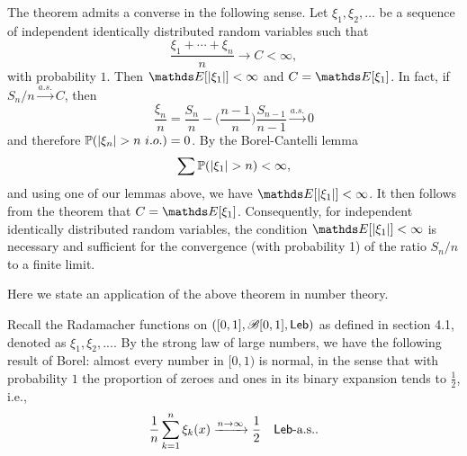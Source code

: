\begin{remark}
The theorem admits a converse in the following sense. Let $\xi_1, \xi_2, \dots$ be a sequence of independent identically distributed random variables such that
\begin{equation*}
    \frac{\xi_1 + \cdots + \xi_n}{n} \to C < \infty,
\end{equation*}
with probability $1$. Then $\E[|\xi_1|] < \infty$ and $C = \E[\xi_1]$. In fact, if $S_n/n \xrightarrow{a.s.}  C$, then
\begin{equation*}
    \frac{\xi_n}{n} = \frac{S_n}{n} - \bigg( \frac{n-1}{n}\bigg) \frac{S_{n-1}}{n-1} \xrightarrow{a.s.} 0
\end{equation*}
and therefore $\mathbb{P}(|\xi_n| > n \, \, i.o.) = 0$. By the Borel-Cantelli lemma
\begin{equation*}
    \sum \mathbb{P}(|\xi_1| > n) < \infty,
\end{equation*}
and using one of our lemmas above, we have $\E[|\xi_1|] < \infty$. It then follows from the theorem that $C = \E[\xi_1]$. Consequently, for independent identically distributed random variables, the condition $\E[|\xi_1|] < \infty$ is necessary and sufficient for the convergence (with probability 1) of the ratio $S_n/n$ to a finite limit.
\end{remark}


Here we state an application of the above theorem in number theory.
\begin{example}
Recall the Radamacher functions on $([0,1], \mathcal{B}[0,1], \mathsf{Leb})$ as defined in section 4.1, denoted as $\xi_1, \xi_2, ...$. By the strong law of large numbers, we have the following result of Borel: almost every number in $[0, 1)$ is normal, in the sense that with probability $1$ the proportion of zeroes and ones in its binary expansion tends to $\frac12$, i.e.,
\begin{equation*}
    \frac{1}{n} \sum_{k=1}^n \xi_k(x) \xrightarrow{n\to\infty} \frac12 \quad \mathsf{Leb}\text{-a.s.}. 
\end{equation*}
\end{example}

